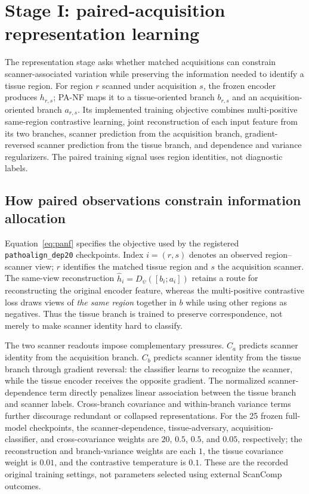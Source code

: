 \section{Stage I: paired-acquisition representation learning}


The representation stage asks whether matched acquisitions can constrain scanner-associated variation while preserving the information needed to identify a tissue region. For region $r$ scanned under acquisition $s$, the frozen encoder produces $h_{r,s}$; PA-NF maps it to a tissue-oriented branch $b_{r,s}$ and an acquisition-oriented branch $a_{r,s}$. Its implemented training objective combines multi-positive same-region contrastive learning, joint reconstruction of each input feature from its two branches, scanner prediction from the acquisition branch, gradient-reversed scanner prediction from the tissue branch, and dependence and variance regularizers. The paired training signal uses region identities, not diagnostic labels.

\subsection{How paired observations constrain information allocation}
Equation~\ref{eq:panf} specifies the objective used by the registered \texttt{pathoalign\_dep20} checkpoints. Index $i=(r,s)$ denotes an observed region--scanner view; $r$ identifies the matched tissue region and $s$ the acquisition scanner. The same-view reconstruction $\widehat h_i=D_{\psi}([b_i;a_i])$ retains a route for reconstructing the original encoder feature, whereas the multi-positive contrastive loss draws views of \emph{the same region} together in $b$ while using other regions as negatives. Thus the tissue branch is trained to preserve correspondence, not merely to make scanner identity hard to classify.

The two scanner readouts impose complementary pressures. $C_a$ predicts scanner identity from the acquisition branch. $C_b$ predicts scanner identity from the tissue branch through gradient reversal: the classifier learns to recognize the scanner, while the tissue encoder receives the opposite gradient. The normalized scanner-dependence term directly penalizes linear association between the tissue branch and scanner labels. Cross-branch covariance and within-branch variance terms further discourage redundant or collapsed representations. For the 25 frozen full-model checkpoints, the scanner-dependence, tissue-adversary, acquisition-classifier, and cross-covariance weights are $20$, $0.5$, $0.5$, and $0.05$, respectively; the reconstruction and branch-variance weights are each $1$, the tissue covariance weight is $0.01$, and the contrastive temperature is $0.1$. These are the recorded original training settings, not parameters selected using external ScanComp outcomes.

